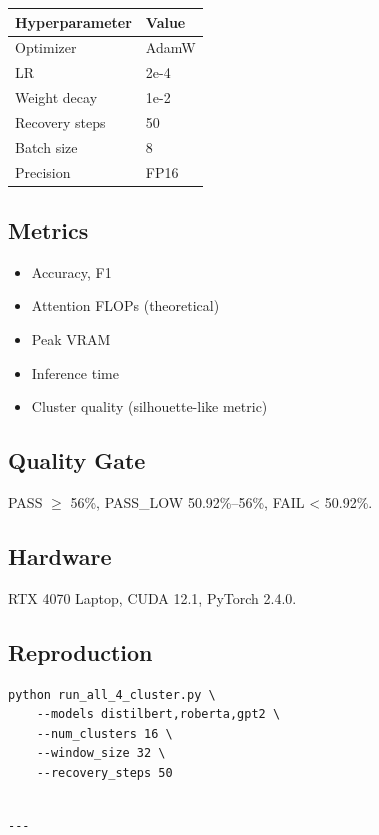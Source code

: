 \begin{table}[H]
\centering
\small
\begin{tabular}{ll}
\toprule
\textbf{Hyperparameter} & \textbf{Value} \\
\midrule
Optimizer & AdamW \\
LR & 2e-4 \\
Weight decay & 1e-2 \\
Recovery steps & 50 \\
Batch size & 8 \\
Precision & FP16 \\
\bottomrule
\end{tabular}
\end{table}

\subsection{Metrics}

\begin{itemize}
\item Accuracy, F1
\item Attention FLOPs (theoretical)
\item Peak VRAM
\item Inference time
\item Cluster quality (silhouette-like metric)

\end{itemize}
\subsection{Quality Gate}

PASS $\ge$ 56\%, PASS\_LOW 50.92\%--56\%, FAIL < 50.92\%.

\subsection{Hardware}

RTX 4070 Laptop, CUDA 12.1, PyTorch 2.4.0.

\subsection{Reproduction}

\begin{lstlisting}
python run_all_4_cluster.py \
    --models distilbert,roberta,gpt2 \
    --num_clusters 16 \
    --window_size 32 \
    --recovery_steps 50
\end{lstlisting}
\begin{lstlisting}

---
\end{lstlisting}